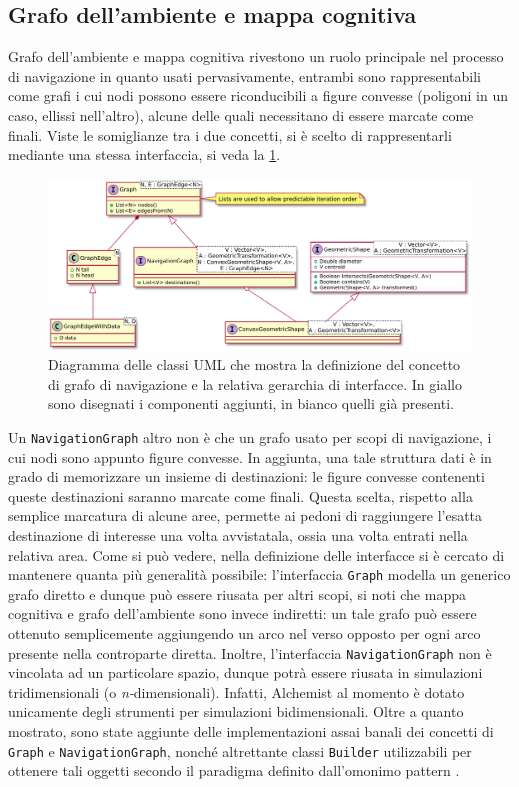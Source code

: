\documentclass[12pt,a4paper,openright,oneside]{book}
\begin{document}
\subsection{Grafo dell'ambiente e mappa cognitiva}
Grafo dell'ambiente e mappa cognitiva rivestono un ruolo principale nel processo di navigazione in quanto usati pervasivamente, entrambi sono rappresentabili come grafi i cui nodi possono essere riconducibili a figure convesse (poligoni in un caso, ellissi nell'altro), alcune delle quali necessitano di essere marcate come finali. Viste le somiglianze tra i due concetti, si è scelto di rappresentarli mediante una stessa interfaccia, si veda la \cref{fig:graph}.
\begin{figure}
	\centering
	\includegraphics[width=\linewidth]{figures/graph.pdf}
	\caption{Diagramma delle classi UML che mostra la definizione del concetto di grafo di navigazione e la relativa gerarchia di interfacce. In giallo sono disegnati i componenti aggiunti, in bianco quelli già presenti.}
	\label{fig:graph}
\end{figure}
Un \texttt{NavigationGraph} altro non è che un grafo usato per scopi di navigazione, i cui nodi sono appunto figure convesse. In aggiunta, una tale struttura dati è in grado di memorizzare un insieme di destinazioni: le figure convesse contenenti queste destinazioni saranno marcate come finali. Questa scelta, rispetto alla semplice marcatura di alcune aree, permette ai pedoni di raggiungere l'esatta destinazione di interesse una volta avvistatala, ossia una volta entrati nella relativa area. Come si può vedere, nella definizione delle interfacce si è cercato di mantenere quanta più generalità possibile: l'interfaccia \texttt{Graph} modella un generico grafo diretto e dunque può essere riusata per altri scopi, si noti che mappa cognitiva e grafo dell'ambiente sono invece indiretti: un tale grafo può essere ottenuto semplicemente aggiungendo un arco nel verso opposto per ogni arco presente nella controparte diretta. Inoltre, l'interfaccia \texttt{NavigationGraph} non è vincolata ad un particolare spazio, dunque potrà essere riusata in simulazioni tridimensionali (o \emph{n-}dimensionali). Infatti, Alchemist al momento è dotato unicamente degli strumenti per simulazioni bidimensionali. Oltre a quanto mostrato, sono state aggiunte delle implementazioni assai banali dei concetti di \texttt{Graph} e \texttt{NavigationGraph}, nonché altrettante classi \texttt{Builder} utilizzabili per ottenere tali oggetti secondo il paradigma definito dall'omonimo pattern \cite{GoFDesignPatterns}.
\end{document}

